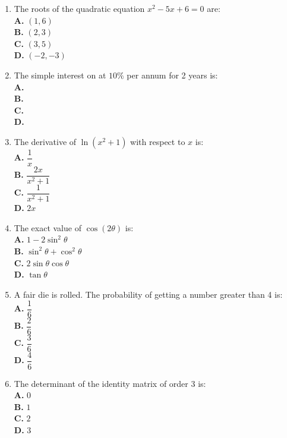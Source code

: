 \documentclass[11pt]{article}
\begin{document}
\begin{enumerate}[label=Q\arabic*., leftmargin=*]
\item The roots of the quadratic equation $x^2 - 5x + 6 = 0$ are:
\\[0.3em]
\textbf{A.} $(1, 6)$\\
\textbf{B.} $(2, 3)$\\
\textbf{C.} $(3, 5)$\\
\textbf{D.} $(-2, -3)$

\item The simple interest on  at $10\%$ per annum for 2 years is:
\\[0.3em]
\textbf{A.} \\
\textbf{B.} \\
\textbf{C.} \\
\textbf{D.} 

\item The derivative of $\ln(x^2+1)$ with respect to $x$ is:
\\[0.3em]
\textbf{A.} $\dfrac{1}{x}$\\
\textbf{B.} $\dfrac{2x}{x^2+1}$\\
\textbf{C.} $\dfrac{1}{x^2+1}$\\
\textbf{D.} $2x$

\item The exact value of $\cos(2\theta)$ is:
\\[0.3em]
\textbf{A.} $1 - 2\sin^2\theta$\\
\textbf{B.} $\sin^2\theta + \cos^2\theta$\\
\textbf{C.} $2\sin\theta\cos\theta$\\
\textbf{D.} $\tan\theta$

\item A fair die is rolled. The probability of getting a number greater than 4 is:
\\[0.3em]
\textbf{A.} $\dfrac{1}{6}$\\
\textbf{B.} $\dfrac{2}{6}$\\
\textbf{C.} $\dfrac{3}{6}$\\
\textbf{D.} $\dfrac{4}{6}$

\item The determinant of the identity matrix of order 3 is:
\\[0.3em]
\textbf{A.} $0$\\
\textbf{B.} $1$\\
\textbf{C.} $2$\\
\textbf{D.} $3$


\end{enumerate}
\end{document}
